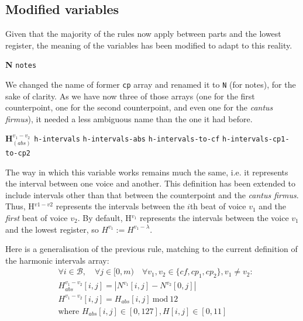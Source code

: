 \subsection{Modified variables} \label{subsection:modified_variables}
Given that the majority of the rules now apply between parts and the lowest register, the meaning of the variables has been modified to adapt to this reality. 

\vspace{.5cm} \noindent \textbf{N} \hspace{.2cm} \texttt{notes} 

We changed the name of former \texttt{cp} array and renamed it to \texttt{N} (for notes), for the sake of clarity. As we have now three of those arrays (one for the first counterpoint, one for the second counterpoint, and even one for the \textit{cantus firmus}), it needed a less ambiguous name than the one it had before.


\vspace{.5cm} \noindent \textbf{H}$_{(abs)}^{v_1-v_2}$ \hspace{.2cm} \texttt{h-intervals}\hspace{.2cm} \texttt{h-intervals-abs}\hspace{.2cm} \texttt{h-intervals-to-cf}\hspace{.2cm} \texttt{h-intervals-cp1-to-cp2}

The way in which this variable works remains much the same, i.e. it represents the interval between one voice and another. This definition has been extended to include intervals other than that between the counterpoint and the \textit{cantus firmus}. Thus, H$^{v1-v2}$ represents the intervals between the $i$th beat of voice $v_1$ and the \textit{first} beat of voice $v_2$. By default, H$^{v_1}$ represents the intervals between the voice $v_1$ and the lowest register, so $H^{v_1} := H^{v_1-\lambda}$.

Here is a generalisation of the previous rule, matching to the current definition of the harmonic intervals array:
\begin{equation}
\begin{aligned}
    &\forall i \in \mathcal{B}, \quad \forall j \in [0, m) \quad \forall v_1, v_2 \in \{cf, cp_1, cp_2\}, v_1 \neq v_2:\\
    &H_{abs}^{v_1-v_2}[i, j] = \left|N^{v_1}[i, j] - N^{v_2}[0,j]\right|\\
    &H^{v_1-v_2}[i, j] = H_{abs}[i, j]\ \text{mod}\ 12\\
    &\text{where } H_{abs}[i, j] \in [0, 127], H[i, j] \in [0, 11]
\end{aligned}
\end{equation}


